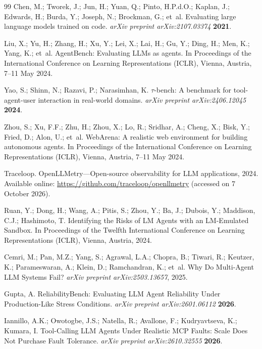 \documentclass[make,article,submit,moreauthors,pdftex]{mdpi}
\begin{document}
\begin{thebibliography}{99}
Chen, M.; Tworek, J.; Jun, H.; Yuan, Q.; Pinto, H.P.d.O.; Kaplan, J.; Edwards, H.; Burda, Y.; Joseph, N.; Brockman, G.; et~al.
\newblock Evaluating large language models trained on code.
\newblock \textit{arXiv preprint arXiv:2107.03374} \textbf{2021}.

Liu, X.; Yu, H.; Zhang, H.; Xu, Y.; Lei, X.; Lai, H.; Gu, Y.; Ding, H.; Men, K.; Yang, K.; et~al.
\newblock AgentBench: Evaluating LLMs as agents.
\newblock In Proceedings of the International Conference on Learning Representations (ICLR), Vienna, Austria, 7--11 May 2024.

Yao, S.; Shinn, N.; Razavi, P.; Narasimhan, K.
\newblock $\tau$-bench: A benchmark for tool-agent-user interaction in real-world domains.
\newblock \textit{arXiv preprint arXiv:2406.12045} \textbf{2024}.

Zhou, S.; Xu, F.F.; Zhu, H.; Zhou, X.; Lo, R.; Sridhar, A.; Cheng, X.; Bisk, Y.; Fried, D.; Alon, U.; et~al.
\newblock WebArena: A realistic web environment for building autonomous agents.
\newblock In Proceedings of the International Conference on Learning Representations (ICLR), Vienna, Austria, 7--11 May 2024.

Traceloop.
\newblock OpenLLMetry---Open-source observability for LLM applications, 2024.
\newblock Available online: \url{https://github.com/traceloop/openllmetry} (accessed on 7 October 2026).

Ruan, Y.; Dong, H.; Wang, A.; Pitis, S.; Zhou, Y.; Ba, J.; Dubois, Y.; Maddison, C.J.; Hashimoto, T.
\newblock Identifying the Risks of LM Agents with an LM-Emulated Sandbox.
\newblock In Proceedings of the Twelfth International Conference on Learning Representations (ICLR), Vienna, Austria, 2024.

Cemri, M.; Pan, M.Z.; Yang, S.; Agrawal, L.A.; Chopra, B.; Tiwari, R.; Keutzer, K.; Parameswaran, A.; Klein, D.; Ramchandran, K.; et~al.
\newblock Why Do Multi-Agent LLM Systems Fail?
\newblock \textit{arXiv preprint arXiv:2503.13657}, 2025.

Gupta, A.
\newblock ReliabilityBench: Evaluating LLM Agent Reliability Under Production-Like Stress Conditions.
\newblock \textit{arXiv preprint arXiv:2601.06112} \textbf{2026}.

Iannillo, A.K.; Owotogbe, J.S.; Natella, R.; Avallone, F.; Kudryavtseva, K.; Kumara, I.
\newblock Tool-Calling LLM Agents Under Realistic MCP Faults: Scale Does Not Purchase Fault Tolerance.
\newblock \textit{arXiv preprint arXiv:2610.32555} \textbf{2026}.


\end{thebibliography}
\end{document}
